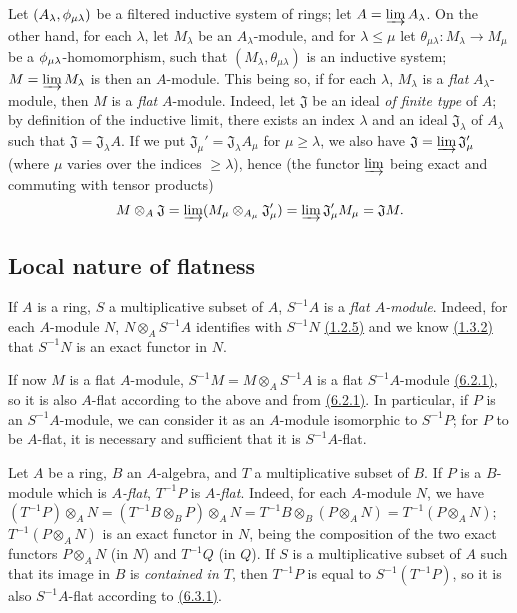 \begin{env}[6.2.3]
\label{0.6.2.3}
Let $(A_\lambda,\phi_{\mu\lambda})$ be a filtered inductive system of rings;
let $A=\varinjlim A_\lambda$. On the other hand, for each $\lambda$, let
$M_\lambda$ be an $A_\lambda$-module, and for $\lambda\leqslant\mu$ let
$\theta_{\mu\lambda}:M_\lambda\to M_\mu$ be a $\phi_{\mu\lambda}$-homomorphism,
such that $(M_\lambda,\theta_{\mu\lambda})$ is an inductive system;
$M=\varinjlim M_\lambda$ is then an $A$-module. This being so, if for each
$\lambda$, $M_\lambda$ is a {\em flat} $A_\lambda$-module, then $M$ is a
{\em flat} $A$-module. Indeed, let $\mathfrak{J}$ be an ideal {\em of finite
type} of $A$; by definition of the inductive limit, there exists an index
$\lambda$ and an ideal $\mathfrak{J}_\lambda$ of $A_\lambda$ such that
$\mathfrak{J}=\mathfrak{J}_\lambda A$. If we put
$\mathfrak{J}_\mu'=\mathfrak{J}_\lambda A_\mu$ for $\mu\geqslant\lambda$, we
also have $\mathfrak{J}=\varinjlim\mathfrak{J}_\mu'$ (where $\mu$ varies over
the indices $\geqslant\lambda$), hence (the functor $\varinjlim$ being exact and
commuting with tensor products)
\[
  M\otimes_A\mathfrak{J}=\varinjlim(M_\mu\otimes_{A_\mu}\mathfrak{J}_\mu')
  =\varinjlim\mathfrak{J}_\mu' M_\mu=\mathfrak{J}M.
\]
\end{env}

\subsection{Local nature of flatness}
\label{subsection-local-nature-of-flatness}

\begin{env}[6.3.1]
\label{0.6.3.1}
If $A$ is a ring, $S$ a multiplicative subset of $A$, $S^{-1}A$ is a {\em flat
$A$-module}. Indeed, for each $A$-module $N$, $N\otimes_A S^{-1}A$ identifies
with $S^{-1}N$ \hyperref[0.1.2.5]{(1.2.5)} and we know \hyperref[0.1.3.2]{(1.3.2)}
that $S^{-1}N$ is an exact functor in $N$.

If now $M$ is a flat $A$-module, $S^{-1}M=M\otimes_A S^{-1}A$ is a flat
$S^{-1}A$-module \hyperref[0.6.2.1]{(6.2.1)}, so it is also $A$-flat according to the
above and from \hyperref[0.6.2.1]{(6.2.1)}. In particular, if $P$ is an $S^{-1}A$-module,
we can consider it as an $A$-module isomorphic to $S^{-1}P$; for $P$ to be
$A$-flat, it is necessary and sufficient that it is $S^{-1}A$-flat.
\end{env}

\begin{env}[6.3.2]
\label{0.6.3.2}
Let $A$ be a ring, $B$ an $A$-algebra, and $T$ a multiplicative subset of $B$.
If $P$ is a $B$-module which is {\em $A$-flat}, $T^{-1}P$ is {\em $A$-flat}.
Indeed, for each $A$-module $N$, we have
$(T^{-1}P)\otimes_A N=(T^{-1}B\otimes_B P)\otimes_A N
  =T^{-1}B\otimes_B(P\otimes_A N)
  =T^{-1}(P\otimes_A N)$; $T^{-1}(P\otimes_A N)$ is an exact functor in $N$,
being the composition of the two exact functors $P\otimes_A N$ (in $N$) and
$T^{-1}Q$ (in $Q$). If $S$ is a multiplicative subset of $A$ such that its image
in $B$ is {\em contained in $T$}, then $T^{-1}P$ is equal to $S^{-1}(T^{-1}P)$,
so it is also $S^{-1}A$-flat according to \hyperref[0.6.3.1]{(6.3.1)}.
\end{env}

